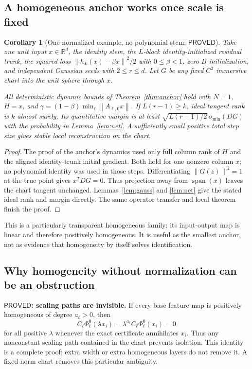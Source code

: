 \documentclass[12pt,a4paper]{article}
\theoremstyle{readable}
\newtheorem{corollary}[theorem]{Corollary}
\theoremstyle{definition}\newtheorem{example}[theorem]{Example}
\newcommand{\R}{\mathbb R}\newcommand{\rank}{\operatorname{rank}}
\newcommand{\Span}{\operatorname{span}}\newcommand{\diag}{\operatorname{diag}}
\newcommand{\norm}[1]{\left\|#1\right\|}
\newcommand{\PP}{\mathsf{PROVED}}\newcommand{\FF}{\mathsf{FALSE}}
\begin{document}
\subsection{A homogeneous anchor works once scale is fixed}
\begin{corollary}[One normalized example, no polynomial stem; \(\PP\)]\label{cor:sphere}
Take one unit input \(x\in\R^d\), the identity stem, the \(L\)-block identity-initialized residual trunk, the squared loss \(\norm{h_L(x)-\beta x}^2/2\) with \(0\le\beta<1\), zero \(B\)-initialization, and independent Gaussian seeds with \(2\le r\le d\). Let \(G\) be any fixed \(C^2\) immersive chart into the unit sphere through \(x\).

All deterministic dynamic bounds of Theorem~\ref{thm:anchor} hold with \(N=1\), \(H=x\), and \(\gamma=(1-\beta)\min_\ell\norm{A_{\ell,0}x}\). If \(L(r-1)\ge k\), ideal tangent rank is \(k\) almost surely. Its quantitative margin is at least \(\sqrt{L(r-1)/2}\,\sigma_{\min}(DG)\) with the probability in Lemma~\ref{lem:net}. A sufficiently small positive total step size gives stable local reconstruction on the chart.
\end{corollary}
\begin{proof}
The proof of the anchor's dynamics used only full column rank of \(H\) and the aligned identity-trunk initial gradient. Both hold for one nonzero column \(x\); no polynomial identity was used in those steps. Differentiating \(\norm{G(z)}^2=1\) at the true point gives \(x^TDG=0\). Thus projection away from \(\Span(x)\) leaves the chart tangent unchanged. Lemmas~\ref{lem:gauss} and \ref{lem:net} give the stated ideal rank and margin directly. The same operator transfer and local theorem finish the proof.
\end{proof}
This is a particularly transparent homogeneous family: its input-output map is linear and therefore positively homogeneous. It is useful as the smallest anchor, not as evidence that homogeneity by itself solves identification.

\subsection{Why homogeneity without normalization can be an obstruction}
\textbf{\(\PP\): scaling paths are invisible.} If every base feature map is positively homogeneous of degree \(a_\ell>0\), then
\[
C_\ell\Phi_\ell^0(\lambda x_i)
=\lambda^{a_\ell}C_\ell\Phi_\ell^0(x_i)=0
\]
for all positive \(\lambda\) whenever the exact certificate annihilates \(x_i\). Thus any nonconstant scaling path contained in the chart prevents isolation. This identity is a complete proof; extra width or extra homogeneous layers do not remove it. A fixed-norm chart removes this particular ambiguity.
\end{document}
